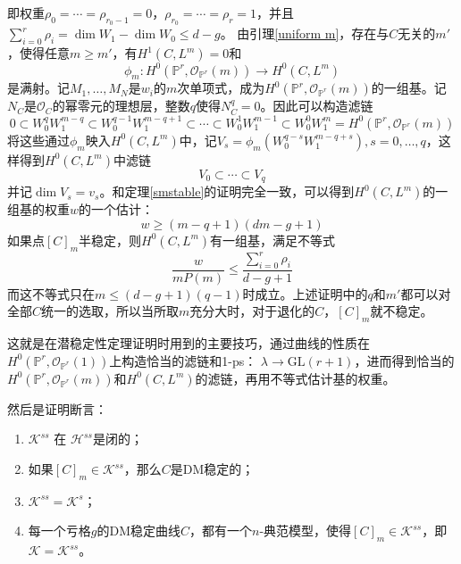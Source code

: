 即权重$ \rho_0=\cdots=\rho_{r_0-1}=0 $，$ \rho_{r_0}=\cdots=\rho_r=1 $，并且$ \sum_{i=0}^{r}\rho_i=\dim W_1-\dim W_0\leqslant d-g $。
由引理\ref{uniform m}，存在与$ C $无关的$ m' $，使得任意$ m\geqslant m' $，有$ H^1(C,L^m)=0 $和
$$ \phi_m:H^0(\mathbb{P}^r,\mathscr{O}_{\mathbb{P}^r}(m))\to H^0(C,L^m) $$
是满射。记$ M_1,\ldots,M_N $是$ w_i $的$ m $次单项式，成为$ H^0(\mathbb{P}^r,\mathscr{O}_{\mathbb{P}^r}(m)) $的一组基。记$ N_C $是$ \mathscr{O}_C $的幂零元的理想层，整数$ q $使得$ N_C^q=0 $。因此可以构造滤链
$$ 0\subset W_0^qW_1^{m-q}\subset W_0^{q-1}W_1^{m-q+1}\subset\cdots\subset W_0^1W_1^{m-1}\subset  W_0^0W_1^m=H^0(\mathbb{P}^r,\mathscr{O}_{\mathbb{P}^r}(m)) $$
将这些通过$ \phi_m $映入$ H^0(C,L^m) $中，记$ V_s=\phi_m( W_0^{q-s}W_1^{m-q+s} ),s=0,\ldots,q $，这样得到$ H^0(C,L^m)  $中滤链
$$ V_0\subset \cdots \subset V_q $$
并记$ \dim V_s=v_s $。和定理\ref{smstable}的证明完全一致，可以得到$ H^0(C,L^m) $的一组基的权重$ w $的一个估计：
$$ w\geqslant (m-q+1)(dm-g+1) $$
如果点$ [C]_m $半稳定，则$ H^0(C,L^m) $有一组基，满足不等式
$$ \frac{w}{mP(m)}\leqslant \frac{\sum_{i=0}^{r}\rho_i}{d-g+1}$$
而这不等式只在$ m\leqslant (d-g+1)(q-1) $时成立。上述证明中的$ q $和$ m' $都可以对全部$ C $统一的选取，所以当所取$ m $充分大时，对于退化的$ C $，$ [C]_m $就不稳定。

这就是在潜稳定性定理证明时用到的主要技巧，通过曲线的性质在$ H^0(\mathbb{P}^r,\mathscr{O}_{\mathbb{P}^r}(1)) $上构造恰当的滤链和1-ps： $ \lambda \to \mathrm{GL}(r+1) $，进而得到恰当的$ H^0(\mathbb{P}^r,\mathscr{O}_{\mathbb{P}^r}(m)) $和$ H^0(C,L^m) $的滤链，再用不等式估计基的权重。

然后是证明断言：
\begin{enumerate}
	\item $ \mathcal{K}^{ss}$ 在 $ \mathcal{H}^{ss} $是闭的；
	\item 如果$ [C]_m\in \mathcal{K}^{ss} $，那么$ C $是DM稳定的；
	\item $ \mathcal{K}^{ss}=\mathcal{K}^s $；
	\item 每一个亏格$ g $的DM稳定曲线$ C $，都有一个$ n $-典范模型，使得$ [C]_m\in \mathcal{K}^{ss} $，即$ \mathcal{K}=\mathcal{K}^{ss} $。
\end{enumerate}

